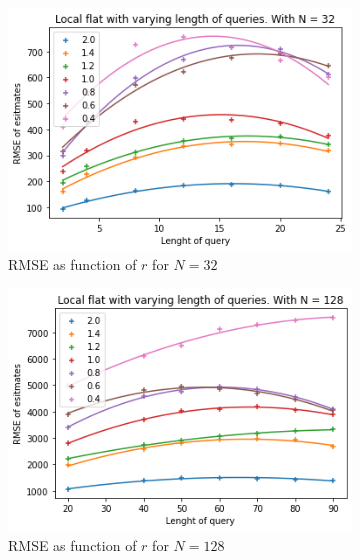 \documentclass[11pt]{article}
\theoremstyle{definition}
\begin{document}
\begin{figure}[H]
\centering
\begin{subfigure}{.4\textwidth}
  \centering
  \includegraphics[width=\linewidth]{figures/local_flat/varying_r/loc_flat_varying_length_N_poly_=32.png}
  \caption{RMSE as function of $r$ for $N=32$}
  \label{fig:29}
\end{subfigure}%
\begin{subfigure}{.4\textwidth}
  \centering
  \includegraphics[width=\linewidth]{figures/local_flat/varying_r/loc_flat_varying_length_N_poly_=128.png}
  \caption{RMSE as function of $r$ for $N=128$}
  \label{fig:30}
\end{subfigure}
\begin{subfigure}{.4\textwidth}
  \centering

\end{subfigure}
\end{figure}
\end{document}
